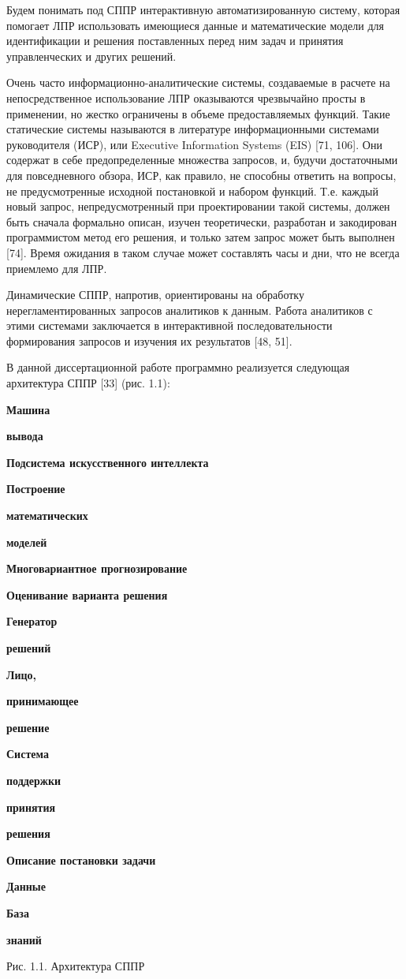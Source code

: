 \documentclass{article}
\begin{document}
Будем понимать под СППР интерактивную автоматизированную 
систему, которая помогает ЛПР использовать 
имеющиеся данные и математические модели для 
идентификации и решения поставленных перед 
ним задач и принятия управленческих и других 
решений. 

Очень часто информационно-аналитические системы, 
создаваемые в расчете на непосредственное 
использование ЛПР оказываются чрезвычайно 
просты в применении, но жестко ограничены в 
объеме предоставляемых функций. Такие статические 
системы называются в литературе информационными 
системами руководителя (ИСР), или Executive Information 
Systems (EIS) [71, 106]. Они содержат в себе предопределенные 
множества запросов, и, будучи достаточными 
для повседневного обзора, ИСР, как правило, 
не способны ответить на вопросы, не предусмотренные 
исходной постановкой и набором функций. Т.е. 
каждый новый запрос, непредусмотренный при 
проектировании такой системы, должен быть сначала 
формально описан, изучен теоретически, разработан 
и закодирован программистом метод его решения, 
и только затем запрос может быть выполнен \label{OLEHLINK32}\label{OLEHLINK33}[74]. 
Время ожидания в таком случае может составлять 
часы и дни, что не всегда приемлемо для ЛПР. 

Динамические СППР, напротив, ориентированы 
на обработку нерегламентированных запросов 
аналитиков к данным. Работа аналитиков с этими 
системами заключается в интерактивной последовательности 
формирования запросов и изучения их результатов 
[48, 51].

В данной диссертационной работе программно 
реализуется следующая архитектура СППР [33] 
(рис. 1.1):

\begin{center}
\textbf{Машина}

\textbf{вывода}

\textbf{Подсистема искусственного интеллекта}

\textbf{Построение}

\textbf{математических}

\textbf{моделей}

\textbf{Многовариантное прогнозирование}

\textbf{Оценивание варианта решения}

\textbf{Генератор}

\textbf{решений}

\textbf{Лицо,}

\textbf{принимающее }

\textbf{решение}

\textbf{Система}

\textbf{поддержки}

\textbf{принятия }

\textbf{решения}

\textbf{Описание постановки задачи}

\textbf{Данные}

\textbf{База}

\textbf{знаний}\fancyfoot[LE]{\thepage{}}
\fancyfoot[LO]{\thepage{}}

Рис. 1.1. Архитектура СППР
\end{center}
\end{document}
